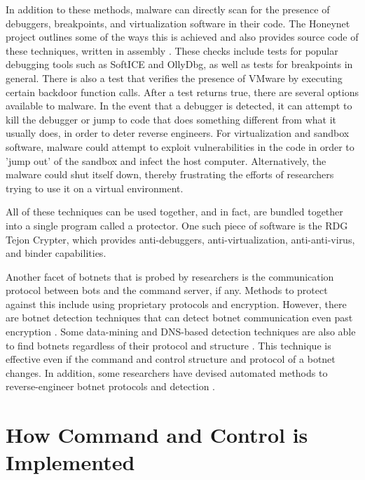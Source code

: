 \documentclass{acm_proc_article-sp}
\begin{document}
In addition to these methods, malware can directly scan for the presence of debuggers, breakpoints, and virtualization software in their code. The Honeynet project outlines some of the ways this is achieved and also provides source code of these techniques, written in assembly \cite{honeynet:appendix}. These checks include tests for popular debugging tools such as SoftICE and OllyDbg, as well as tests for breakpoints in general. There is also a test that verifies the presence of VMware by executing certain backdoor function calls. After a test returns true, there are several options available to malware. In the event that a debugger is detected, it can attempt to kill the debugger or jump to code that does something different from what it usually does, in order to deter reverse engineers. For virtualization and sandbox software, malware could attempt to exploit vulnerabilities in the code in order to 'jump out' of the sandbox and infect the host computer. Alternatively, the malware could shut itself down, thereby frustrating the efforts of researchers trying to use it on a virtual environment.

All of these techniques can be used together, and in fact, are bundled together into a single program called a protector. One such piece of software is the RDG Tejon Crypter, which provides anti-debuggers, anti-virtualization, anti-anti-virus, and binder capabilities\cite{rdg:crypter}. 

Another facet of botnets that is probed by researchers is the communication protocol between bots and the command server, if any. Methods to protect against this include using proprietary protocols and encryption. However, there are botnet detection techniques that can detect botnet communication even past encryption \cite{feily:detection}. Some data-mining and DNS-based detection techniques are also able to find botnets regardless of their protocol and structure \cite{gu:botminer}. This technique is effective even if the command and control structure and protocol of a botnet changes. In addition, some researchers have devised automated methods to reverse-engineer botnet protocols and detection \cite{freiling:tracking} \cite{caballero:dispatcher} \cite{gu:botsniffer}. 

\section{How Command and Control is Implemented}
\end{document}

